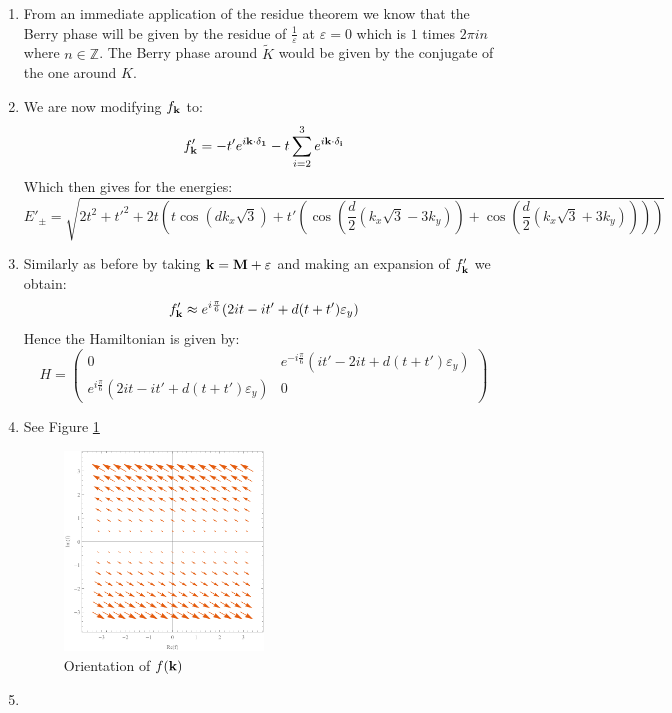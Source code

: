 \documentclass[10pt,a4paper]{article}
\begin{document}
\begin{enumerate}
\item From an immediate application of the residue theorem we know that the Berry phase will be given by the residue of $\frac{1}{\varepsilon}$ at $\varepsilon = 0$ which is $1$ times $2 \pi i n$ where $n \in \mathbb{Z}$. The Berry phase around $\tilde{K}$ would be given by the conjugate of the one around $K$. 

\item We are now modifying $f_{\vb{k}}$ to:
\[
f'_{\vb{k}} = - t' e^{i \vb{k} \cdot \vb{\delta_1}} - t \sum_{i = 2}^3 e^{i \vb{k} \cdot \vb{\delta_i}}
\]
Which then gives for the energies:
\[
E'_\pm = \sqrt{2t^2 + t'^2 + 2t \left( t \cos(d k_x \sqrt{3}) + t'\left( \cos(\frac{d}{2} (k_x \sqrt{3} - 3 k_y)) + \cos(\frac{d}{2}(k_x\sqrt{3} + 3 k_y)) \right) \right)}
\]

\item Similarly as before by taking $\vb{k} = \vb{M} + \vb{\varepsilon}$ and making an expansion of $f'_{\vb{k}}$ we obtain:
\[
f'_{\vb{k}} \approx e^{i\frac{\pi}{6}} (2 i t - i t' + d(t + t')\varepsilon_y)
\]
Hence the Hamiltonian is given by:
\[
H = \begin{pmatrix}
0 & e^{- i \frac{\pi}{6}} (i t' - 2 i t + d(t + t')\varepsilon_y)\\
e^{i\frac{\pi}{6}} (2 i t - i t' + d(t + t')\varepsilon_y) & 0 
\end{pmatrix}
\]

\item See Figure \ref{fkvfield} 
\begin{figure} \label{fkvfield}
\centering
\includegraphics[width=0.5\textwidth]{fkvfield}
\caption{Orientation of $f(\vb{k})$}
\end{figure}

\item 

\end{enumerate}
\end{document}
